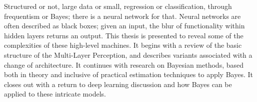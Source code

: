Structured or not, large data or small, regression or classification, through frequentism or Bayes; there is a neural network for that.
Neural networks are often described as black boxes; given an input, the blur of functionality within hidden layers returns an output.  This thesis is presented to reveal some of the complexities of these high-level machines.  It begins with a review of the basic structure of the Multi-Layer Perception, and describes variants associated with a change of architecture.  It continues with research on Bayesian methods, based both in theory and inclusive of practical estimation techniques to apply Bayes.  It closes out with a return to deep learning discussion and how Bayes can be applied to these intricate models.